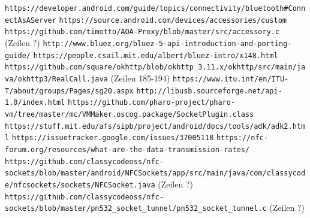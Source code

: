     \renewcommand\refname{Internetquellen}
    \begin{thebibliography}{9}
        \texttt{https://developer.android.com/guide/topics/\linebreak connectivity/bluetooth\#ConnectAsAServer}
        \texttt{https://source.android.com/devices/\linebreak accessories/custom}
        \texttt{https://github.com/timotto/AOA-Proxy/blob/\linebreak master/src/accessory.c} (Zeilen ?)
        \texttt{http://www.bluez.org/bluez-5-api-introduction-and-\linebreak porting-guide/}
        \texttt{https://people.csail.mit.edu/albert/bluez-intro/x148.html}
        \texttt{https://github.com/square/okhttp/blob/okhttp\_3.11.x/\linebreak okhttp/src/main/java/okhttp3/RealCall.java} (Zeilen 185-194)
        \texttt{https://www.itu.int/en/ITU-T/about/groups/Pages/sg20.aspx}
        \texttt{http://libusb.sourceforge.net/api-1.0/index.html}
        \texttt{https://github.com/pharo-project/pharo-vm/tree/\linebreak master/mc/VMMaker.oscog.package/SocketPlugin.class}
        \texttt{https://stuff.mit.edu/afs/sipb/project/android/docs/tools/\linebreak adk/adk2.html}
        \texttt{https://issuetracker.google.com/issues/37005118}
        \texttt{https://nfc-forum.org/resources/what-are-the-data-\linebreak transmission-rates/}
        \texttt{https://github.com/classycodeoss/nfc-sockets/blob/\linebreak master/android/NFCSockets/app/src/main/java/com/classycode/\linebreak nfcsockets/sockets/NFCSocket.java} (Zeilen ?)
        \texttt{https://github.com/classycodeoss/nfc-sockets/blob/\linebreak master/pn532\_socket\_tunnel/pn532\_socket\_tunnel.c} (Zeilen ?)

\end{thebibliography}
